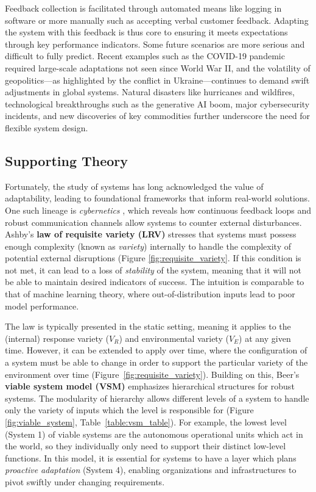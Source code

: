 Feedback collection is facilitated through automated means like logging in software or more manually such as accepting verbal customer feedback. Adapting the system with this feedback is thus core to ensuring it meets expectations through key performance indicators. Some future scenarios are more serious and difficult to fully predict. Recent examples such as the COVID-19 pandemic required large-scale adaptations not seen since World War II, and the volatility of geopolitics—as highlighted by the conflict in Ukraine—continues to demand swift adjustments in global systems. Natural disasters like hurricanes and wildfires, technological breakthroughs such as the generative AI boom, major cybersecurity incidents, and new discoveries of key commodities further underscore the need for flexible system design.

\subsection{Supporting Theory}
Fortunately, the study of systems has long acknowledged the value of adaptability, leading to foundational frameworks that inform real-world solutions. One such lineage is \emph{cybernetics} \cite{wiener1948}, which reveals how continuous feedback loops and robust communication channels allow systems to counter external disturbances. Ashby’s \textbf{law of requisite variety (LRV)} \cite{ashby1956} stresses that systems must possess enough complexity (known as \textit{variety}) internally to handle the complexity of potential external disruptions (Figure \ref{fig:requisite_variety}. If this condition is not met, it can lead to a loss of \textit{stability} of the system, meaning that it will not be able to maintain desired indicators of success. The intuition is comparable to that of machine learning theory, where out-of-distribution inputs lead to poor model performance. 

The law is typically presented in the static setting, meaning it applies to the (internal) response variety ($V_R$) and environmental variety ($V_E$) at any given time. However, it can be extended to apply over time, where the configuration of a system must be able to change in order to support the particular variety of the environment over time (Figure~\ref{fig:requisite_variety}). Building on this, Beer's \textbf{viable system model (VSM)} \cite{beer1959, beer1972} emphasizes hierarchical structures for robust systems. The modularity of hierarchy allows different levels of a system to handle only the variety of inputs which the level is responsible for (Figure \ref{fig:viable_system}, Table~\ref{table:vsm_table}). For example, the lowest level (System 1) of viable systems are the autonomous operational units which act in the world, so they individually only need to support their distinct low-level functions. In this model, it is essential for systems to have a layer which plans \textit{proactive} \textit{adaptation} (System 4), enabling organizations and infrastructures to pivot swiftly under changing requirements. 

